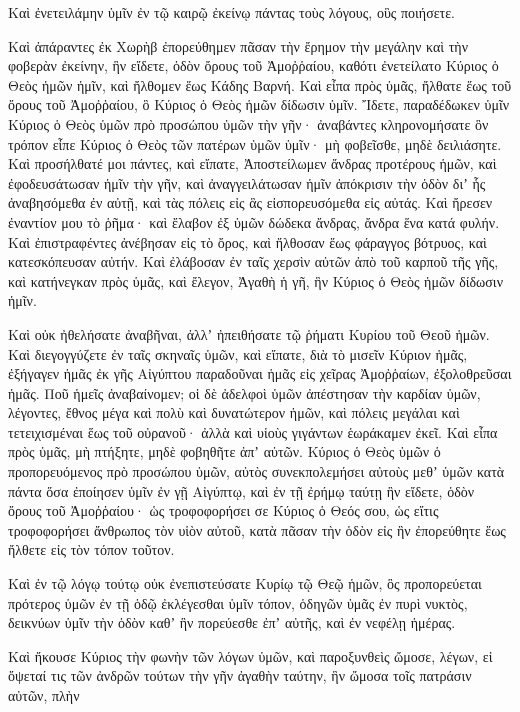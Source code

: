 {Καὶ ἐνετειλάμην ὑμῖν ἐν τῷ καιρῷ ἐκείνῳ πάντας τοὺς λόγους, οὓς ποιήσετε.
\par }{\PP {}Καὶ ἀπάραντες ἐκ Χωρὴβ ἐπορεύθημεν πᾶσαν τὴν ἔρημον τὴν μεγάλην καὶ τὴν φοβερὰν ἐκείνην, ἣν εἴδετε, ὁδὸν ὄρους τοῦ Ἀμοῤῥαίου, καθότι ἐνετείλατο Κύριος ὁ Θεὸς ἡμῶν ἡμῖν, καὶ ἤλθομεν ἕως Κάδης Βαρνή.
Καὶ εἶπα πρὸς ὑμᾶς, ἤλθατε ἕως τοῦ ὄρους τοῦ Ἀμοῤῥαίου, ὃ Κύριος ὁ Θεὸς ἡμῶν δίδωσιν ὑμῖν.
Ἴδετε, παραδέδωκεν ὑμῖν Κύριος ὁ Θεὸς ὑμῶν πρὸ προσώπου ὑμῶν τὴν γῆν· ἀναβάντες κληρονομήσατε ὃν τρόπον εἶπε Κύριος ὁ Θεὸς τῶν πατέρων ὑμῶν ὑμῖν· μὴ φοβεῖσθε, μηδὲ δειλιάσητε.
Καὶ προσήλθατέ μοι πάντες, καὶ εἴπατε, Ἀποστείλωμεν ἄνδρας προτέρους ἡμῶν, καὶ ἐφοδευσάτωσαν ἡμῖν τὴν γῆν, καὶ ἀναγγειλάτωσαν ἡμῖν ἀπόκρισιν τὴν ὁδὸν διʼ ἧς ἀναβησόμεθα ἐν αὐτῇ, καὶ τὰς πόλεις εἰς ἃς εἰσπορευσόμεθα εἰς αὐτάς.
Καὶ ἤρεσεν ἐναντίον μου τὸ ῥῆμα· καὶ ἔλαβον ἐξ ὑμῶν δώδεκα ἄνδρας, ἄνδρα ἕνα κατά φυλήν.
Καὶ ἐπιστραφέντες ἀνέβησαν εἰς τὸ ὄρος, καὶ ἤλθοσαν ἕως φάραγγος βότρυος, καὶ κατεσκόπευσαν αὐτήν.
Καὶ ἐλάβοσαν ἐν ταῖς χερσὶν αὐτῶν ἀπὸ τοῦ καρποῦ τῆς γῆς, καὶ κατήνεγκαν πρὸς ὑμᾶς, καὶ ἔλεγον, Ἀγαθὴ ἡ γῆ, ἣν Κύριος ὁ Θεὸς ἡμῶν δίδωσιν ἡμῖν.
\par }{\PP {}Καὶ οὐκ ἠθελήσατε ἀναβῆναι, ἀλλʼ ἠπειθήσατε τῷ ῥήματι Κυρίου τοῦ Θεοῦ ἡμῶν.
Καὶ διεγογγύζετε ἐν ταῖς σκηναῖς ὑμῶν, καὶ εἴπατε, διὰ τὸ μισεῖν Κύριον ἡμᾶς, ἐξήγαγεν ἡμᾶς ἐκ γῆς Αἰγύπτου παραδοῦναι ἡμᾶς εἰς χεῖρας Ἀμοῤῥαίων, ἐξολοθρεῦσαι ἡμᾶς.
Ποῦ ἡμεῖς ἀναβαίνομεν; οἱ δὲ ἀδελφοὶ ὑμῶν ἀπέστησαν τὴν καρδίαν ὑμῶν, λέγοντες, ἔθνος μέγα καὶ πολὺ καὶ δυνατώτερον ἡμῶν, καὶ πόλεις μεγάλαι καὶ τετειχισμέναι ἕως τοῦ οὐρανοῦ· ἀλλὰ καὶ υἱοὺς γιγάντων ἑωράκαμεν ἐκεῖ.
Καὶ εἶπα πρὸς ὑμᾶς, μὴ πτήξητε, μηδὲ φοβηθῆτε ἀπʼ αὐτῶν.
Κύριος ὁ Θεὸς ὑμῶν ὁ προπορευόμενος πρὸ προσώπου ὑμῶν, αὐτὸς συνεκπολεμήσει αὐτοὺς μεθʼ ὑμῶν κατὰ πάντα ὅσα ἐποίησεν ὑμῖν ἐν γῇ Αἰγύπτῳ,
καὶ ἐν τῇ ἐρήμῳ ταύτῃ ἣν εἴδετε, ὁδὸν ὄρους τοῦ Ἀμοῤῥαίου· ὡς τροφοφορήσει σε Κύριος ὁ Θεός σου, ὡς εἴτις τροφοφορήσει ἄνθρωπος τὸν υἱὸν αὐτοῦ, κατὰ πᾶσαν τὴν ὁδὸν εἰς ἣν ἐπορεύθητε ἕως ἤλθετε εἰς τὸν τόπον τοῦτον.
\par }{\PP {}Καὶ ἐν τῷ λόγῳ τούτῳ οὐκ ἐνεπιστεύσατε Κυρίῳ τῷ Θεῷ ἡμῶν,
ὃς προπορεύεται πρότερος ὑμῶν ἐν τῇ ὁδῷ ἐκλέγεσθαι ὑμῖν τόπον, ὁδηγῶν ὑμᾶς ἐν πυρὶ νυκτὸς, δεικνύων ὑμῖν τὴν ὁδὸν καθʼ ἣν πορεύεσθε ἐπʼ αὐτῆς, καὶ ἐν νεφέλῃ ἡμέρας.
\par }{\PP {}Καὶ ἤκουσε Κύριος τὴν φωνὴν τῶν λόγων ὑμῶν, καὶ παροξυνθεὶς ὤμοσε, λέγων,
εἰ ὄψεταί τις τῶν ἀνδρῶν τούτων τὴν γῆν ἀγαθὴν ταύτην, ἣν ὤμοσα τοῖς πατράσιν αὐτῶν, πλὴν
}
